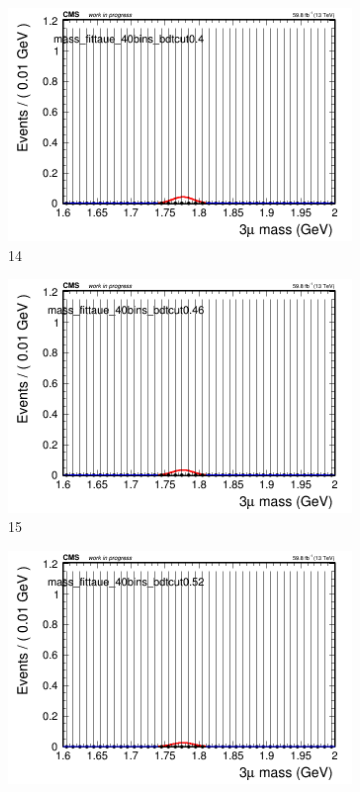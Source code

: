 \begin{figure}[h!]
\begin{subfigure}{0.2\textwidth}
        \includegraphics[width=\textwidth]{unfixed_exp/plots/taue/massfit_taue_40bins_bdtcut0.4.png}
        \caption{14}
    \end{subfigure}
    \begin{subfigure}{0.2\textwidth}
        \includegraphics[width=\textwidth]{unfixed_exp/plots/taue/massfit_taue_40bins_bdtcut0.46.png}
        \caption{15}
    \end{subfigure}
    \begin{subfigure}{0.2\textwidth}
        \includegraphics[width=\textwidth]{unfixed_exp/plots/taue/massfit_taue_40bins_bdtcut0.52.png}

\end{subfigure}
\end{figure}
